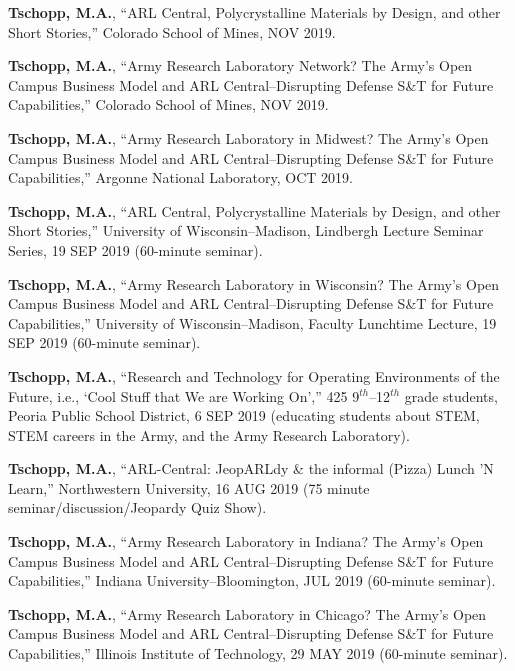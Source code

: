 \begin{cvlist}
\item
\textbf{Tschopp, M.A.}, ``ARL Central, Polycrystalline Materials by Design, and other Short Stories,'' Colorado School of Mines, NOV 2019.

\item
\textbf{Tschopp, M.A.}, ``Army Research Laboratory Network? The Army's Open Campus Business Model and ARL Central--Disrupting Defense S\&T for Future Capabilities,'' Colorado School of Mines, NOV 2019.

\item
\textbf{Tschopp, M.A.}, ``Army Research Laboratory in Midwest? The Army's Open Campus Business Model and ARL Central--Disrupting Defense S\&T for Future Capabilities,'' Argonne National Laboratory, OCT 2019.

\item
\textbf{Tschopp, M.A.}, ``ARL Central, Polycrystalline Materials by Design, and other Short Stories,'' University of Wisconsin--Madison, Lindbergh Lecture Seminar Series, 19 SEP 2019  (60-minute seminar).

\item
\textbf{Tschopp, M.A.}, ``Army Research Laboratory in Wisconsin? The Army's Open Campus Business Model and ARL Central--Disrupting Defense S\&T for Future Capabilities,'' University of Wisconsin--Madison, Faculty Lunchtime Lecture, 19 SEP 2019 (60-minute seminar).

\item
\textbf{Tschopp, M.A.}, ``Research and Technology for Operating Environments of the Future, i.e., `Cool Stuff that We are Working On','' 425 9$^{th}$--12$^{th}$ grade students, Peoria Public School District, 6 SEP 2019 (educating students about STEM, STEM careers in the Army, and the Army Research Laboratory).

\item
\textbf{Tschopp, M.A.}, ``ARL-Central: JeopARLdy \& the informal (Pizza) Lunch 'N Learn,'' Northwestern University, 16 AUG 2019 (75 minute seminar/discussion/Jeopardy Quiz Show).

\item
\textbf{Tschopp, M.A.}, ``Army Research Laboratory in Indiana? The Army's Open Campus Business Model and ARL Central--Disrupting Defense S\&T for Future Capabilities,'' Indiana University--Bloomington, JUL 2019 (60-minute seminar).

\item
\textbf{Tschopp, M.A.}, ``Army Research Laboratory in Chicago? The Army's Open Campus Business Model and ARL Central--Disrupting Defense S\&T for Future Capabilities,''  Illinois Institute of Technology, 29 MAY 2019  (60-minute seminar).


\end{cvlist}
